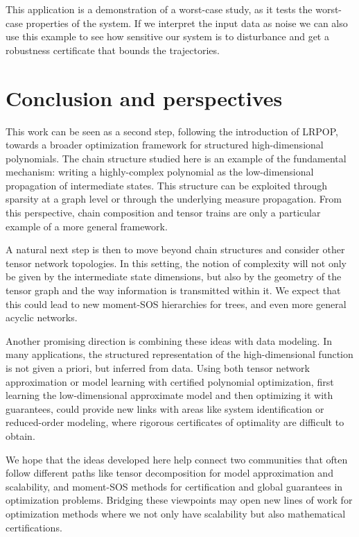 \documentclass[11pt,a4paper]{article}
\theoremstyle{definition}
\begin{document}
This application is a demonstration of a worst-case study, as it  tests the worst-case properties of the system. If we interpret the input data as noise we can also use this example to see how sensitive our system is to disturbance and get a robustness certificate that bounds the trajectories.


\section{Conclusion and perspectives}

This work can be seen as a second step, following the introduction of LRPOP, towards a broader optimization framework for structured high-dimensional polynomials. The chain structure studied here is an example of the fundamental mechanism: writing a highly-complex polynomial as the low-dimensional propagation of intermediate states. This structure can be exploited through sparsity at a graph level or through the underlying measure propagation. From this perspective, chain composition and tensor trains are only a particular example of a more general framework.

A natural next step is then to move beyond chain structures and consider other tensor network topologies. In this setting, the notion of complexity will not only be given by the intermediate state dimensions, but also by the geometry of the tensor graph and the way information is transmitted within it. We expect that this could lead to new moment-SOS hierarchies for trees, and even more general acyclic networks.

Another promising direction is combining these ideas with data modeling. In many applications, the structured representation of the high-dimensional function is not given a priori, but inferred from data. Using both tensor network approximation or model learning with certified polynomial optimization, first learning the low-dimensional approximate model and then optimizing it with guarantees, could provide new links with areas like system identification or reduced-order modeling, where rigorous certificates of optimality are difficult to obtain.

We hope that the ideas developed here help connect two communities that often follow different paths like tensor decomposition for model approximation and scalability, and moment-SOS methods for certification and global guarantees in optimization problems. Bridging these viewpoints may open new lines of work for optimization methods where we not only have scalability but also mathematical certifications.
\end{document}
